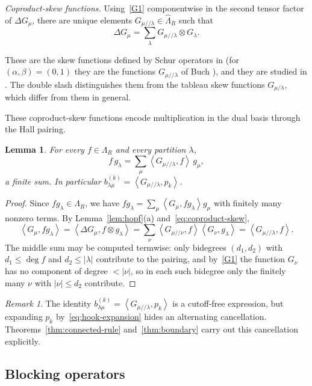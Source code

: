 \documentclass[11pt]{amsart}
\DeclareRobustCommand{\S}{\ensuremath{\mathsection}}
\numberwithin{equation}{section}
\newtheorem{lemma}[theorem]{Lemma}
\theoremstyle{definition}
\theoremstyle{remark}
\newtheorem{remark}[theorem]{Remark}
\newcommand{\Lam}{\Lambda}
\newcommand{\hLam}{\widehat\Lambda}
\newcommand{\Hall}[2]{\left\langle #1,#2\right\rangle}
\newcommand{\sk}{/\!\!/}
\begin{document}
\emph{Coproduct-skew functions.} Using~\ref{G1} componentwise in the second tensor factor of $\Delta G_{\mu}$, there are unique elements
$G_{\mu\sk\lambda}\in\hLam_R$ such that
\begin{equation}
\label{eq:coproduct-skew}
 \Delta G_\mu=\sum_{\lambda}G_{\mu\sk\lambda}\otimes G_\lambda .
\end{equation}

These are the skew functions defined by Schur operators in
\cite[\S5.4, Eq.(34)]{Yeliussizov} (for $(\alpha,\beta)=(0,1)$ they are the
functions $G_{\mu/\!\!/\lambda}$ of Buch \cite{Buch}), and they are studied in
\cite[\S4.1]{IMS24}. The double slash distinguishes them from the tableau
skew functions $G_{\mu/\lambda}$, which differ from them in general.

These coproduct-skew functions encode multiplication in the
dual basis through the Hall pairing.

\begin{lemma}\label{lem:skew-pairing}
For every $f\in\Lam_R$ and every partition $\lambda$,
\[
 f\,g_\lambda=\sum_\mu\Hall{G_{\mu\sk\lambda}}{f}\,g_\mu ,
\]
a finite sum. In particular $b^{(k)}_{\lambda\mu}=\Hall{G_{\mu\sk\lambda}}{p_k}$.
\end{lemma}

\begin{proof}
Since $fg_\lambda\in\Lam_R$, we have
$fg_\lambda=\sum_\mu\Hall{G_\mu}{fg_\lambda}g_\mu$ with finitely many nonzero
terms. By Lemma~\ref{lem:hopf}(a) and~\eqref{eq:coproduct-skew},
\[
 \Hall{G_\mu}{fg_\lambda}=\Hall{\Delta G_\mu}{f\otimes g_\lambda}
 =\sum_\nu\Hall{G_{\mu\sk\nu}}{f}\Hall{G_\nu}{g_\lambda}
 =\Hall{G_{\mu\sk\lambda}}{f}.
\]
The middle sum may be computed termwise: only bidegrees $(d_1,d_2)$ with
$d_1\leq\deg f$ and $d_2\leq|\lambda|$ contribute to the pairing, and
by~\ref{G1} the function $G_\nu$ has no component of degree $<|\nu|$, so in
each such bidegree only the finitely many $\nu$ with $|\nu|\leq d_2$
contribute.
\end{proof}

\begin{remark}\label{rem:hopf-skew}
The identity $b^{(k)}_{\lambda\mu}=\Hall{G_{\mu\sk\lambda}}{p_k}$ is a
cutoff-free expression, but expanding $p_k$ by~\eqref{eq:hook-expansion}
hides an alternating cancellation. Theorems~\ref{thm:connected-rule}
and~\ref{thm:boundary} carry out this cancellation explicitly.
\end{remark}

\subsection{Blocking operators}\label{subsec:operators}
\end{document}

